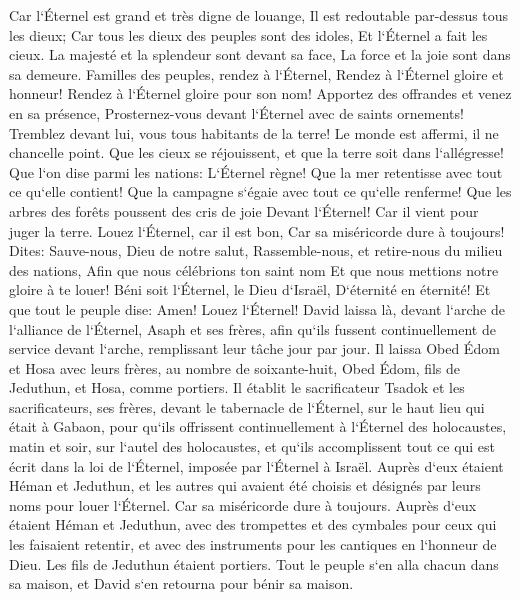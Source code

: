 \verse Car l`Éternel est grand et très digne de louange, Il est redoutable par-dessus tous les dieux; 
\verse Car tous les dieux des peuples sont des idoles, Et l`Éternel a fait les cieux. 
\verse La majesté et la splendeur sont devant sa face, La force et la joie sont dans sa demeure. 
\verse Familles des peuples, rendez à l`Éternel, Rendez à l`Éternel gloire et honneur! 
\verse Rendez à l`Éternel gloire pour son nom! Apportez des offrandes et venez en sa présence, Prosternez-vous devant l`Éternel avec de saints ornements! 
\verse Tremblez devant lui, vous tous habitants de la terre! Le monde est affermi, il ne chancelle point. 
\verse Que les cieux se réjouissent, et que la terre soit dans l`allégresse! Que l`on dise parmi les nations: L`Éternel règne! 
\verse Que la mer retentisse avec tout ce qu`elle contient! Que la campagne s`égaie avec tout ce qu`elle renferme! 
\verse Que les arbres des forêts poussent des cris de joie Devant l`Éternel! Car il vient pour juger la terre. 
\verse Louez l`Éternel, car il est bon, Car sa miséricorde dure à toujours! 
\verse Dites: Sauve-nous, Dieu de notre salut, Rassemble-nous, et retire-nous du milieu des nations, Afin que nous célébrions ton saint nom Et que nous mettions notre gloire à te louer! 
\verse Béni soit l`Éternel, le Dieu d`Israël, D`éternité en éternité! Et que tout le peuple dise: Amen! Louez l`Éternel! 
\verse David laissa là, devant l`arche de l`alliance de l`Éternel, Asaph et ses frères, afin qu`ils fussent continuellement de service devant l`arche, remplissant leur tâche jour par jour. 
\verse Il laissa Obed Édom et Hosa avec leurs frères, au nombre de soixante-huit, Obed Édom, fils de Jeduthun, et Hosa, comme portiers. 
\verse Il établit le sacrificateur Tsadok et les sacrificateurs, ses frères, devant le tabernacle de l`Éternel, sur le haut lieu qui était à Gabaon, 
\verse pour qu`ils offrissent continuellement à l`Éternel des holocaustes, matin et soir, sur l`autel des holocaustes, et qu`ils accomplissent tout ce qui est écrit dans la loi de l`Éternel, imposée par l`Éternel à Israël. 
\verse Auprès d`eux étaient Héman et Jeduthun, et les autres qui avaient été choisis et désignés par leurs noms pour louer l`Éternel. Car sa miséricorde dure à toujours. 
\verse Auprès d`eux étaient Héman et Jeduthun, avec des trompettes et des cymbales pour ceux qui les faisaient retentir, et avec des instruments pour les cantiques en l`honneur de Dieu. Les fils de Jeduthun étaient portiers. 
\verse Tout le peuple s`en alla chacun dans sa maison, et David s`en retourna pour bénir sa maison. 

